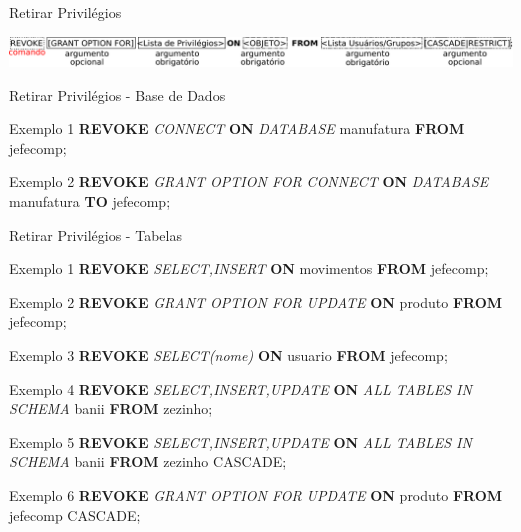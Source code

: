 \documentclass[xcolor=x11names,compress]{beamer}
\begin{document}
\begin{frame}{Retirar Privilégios}

\centering \includegraphics[keepaspectratio,width=\textwidth]{revoke}

\end{frame}

\begin{frame}{Retirar Privilégios - Base de Dados}

\begin{alertblock}{Exemplo 1}
\textbf{REVOKE} \textit{CONNECT} \textbf{ON} \textit{DATABASE} manufatura \textbf{FROM} jefecomp;
\end{alertblock}

\begin{alertblock}{Exemplo 2}
\textbf{REVOKE} \textit{GRANT OPTION FOR CONNECT} \textbf{ON} \textit{DATABASE} manufatura \textbf{TO} jefecomp;
\end{alertblock}

\end{frame}

\begin{frame}[allowframebreaks]{Retirar Privilégios - Tabelas}

\begin{alertblock}{Exemplo 1}
\textbf{REVOKE} \textit{SELECT,INSERT} \textbf{ON} movimentos \textbf{FROM} jefecomp;
\end{alertblock}

\begin{alertblock}{Exemplo 2}
\textbf{REVOKE} \textit{GRANT OPTION FOR UPDATE} \textbf{ON} produto \textbf{FROM} jefecomp;
\end{alertblock}

\begin{alertblock}{Exemplo 3}
\textbf{REVOKE} \textit{SELECT(nome)} \textbf{ON} usuario \textbf{FROM} jefecomp;
\end{alertblock}

\begin{alertblock}{Exemplo 4}
\textbf{REVOKE} \textit{SELECT,INSERT,UPDATE} \textbf{ON} \textit{ALL TABLES IN SCHEMA} banii \textbf{FROM} zezinho;
\end{alertblock}

\begin{alertblock}{Exemplo 5}
\textbf{REVOKE} \textit{SELECT,INSERT,UPDATE} \textbf{ON} \textit{ALL TABLES IN SCHEMA} banii \textbf{FROM} zezinho CASCADE;
\end{alertblock}

\begin{alertblock}{Exemplo 6}
\textbf{REVOKE} \textit{GRANT OPTION FOR UPDATE} \textbf{ON} produto \textbf{FROM} jefecomp CASCADE;
\end{alertblock}

\end{frame}
\end{document}
